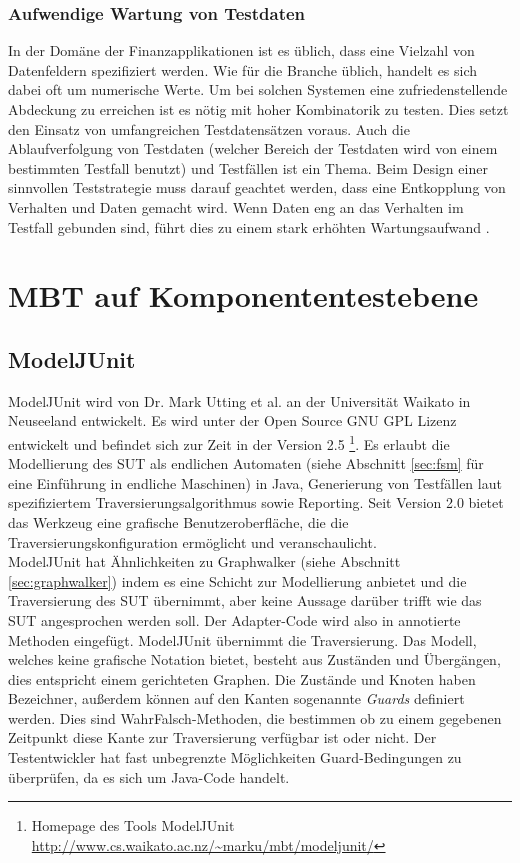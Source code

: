 \subsubsection{Aufwendige Wartung von Testdaten}
In der Domäne der Finanzapplikationen ist es üblich, dass eine Vielzahl von Datenfeldern spezifiziert werden. Wie für die Branche üblich, handelt es sich dabei oft um numerische Werte. Um bei solchen Systemen eine zufriedenstellende Abdeckung zu erreichen ist es nötig mit hoher Kombinatorik zu testen. Dies setzt den Einsatz von umfangreichen Testdatensätzen voraus. Auch die Ablaufverfolgung von Testdaten (welcher Bereich der Testdaten wird von einem bestimmten Testfall benutzt) und Testfällen ist ein Thema. Beim Design einer sinnvollen Teststrategie muss darauf geachtet werden, dass eine Entkopplung von Verhalten und Daten gemacht wird. Wenn Daten eng an das Verhalten im Testfall gebunden sind, führt dies zu einem stark erhöhten Wartungsaufwand \cite{baker_model-driven_2005}. 

\section{MBT auf Komponententestebene}
\label{sec:mbt_unit}

\subsection{ModelJUnit}
\label{sec:modeljunit}
ModelJUnit wird von Dr. Mark Utting et al. an der Universität Waikato in Neuseeland entwickelt. Es wird unter der Open Source GNU GPL Lizenz entwickelt und befindet sich zur Zeit in der Version 2.5 \footnote{Homepage des Tools ModelJUnit \url{http://www.cs.waikato.ac.nz/~marku/mbt/modeljunit/}}. Es erlaubt die Modellierung des \Gls{SUT} als endlichen Automaten (siehe Abschnitt \ref{sec:fsm} für eine Einführung in endliche Maschinen) in Java, Generierung von Testfällen laut spezifiziertem Traversierungsalgorithmus sowie Reporting. Seit Version 2.0 bietet das Werkzeug eine grafische Benutzeroberfläche, die die Traversierungskonfiguration ermöglicht und veranschaulicht.\\
ModelJUnit hat Ähnlichkeiten zu Graphwalker (siehe Abschnitt \ref{sec:graphwalker}) indem es eine Schicht zur Modellierung anbietet und die Traversierung des \gls{SUT} übernimmt, aber keine Aussage darüber trifft wie das \gls{SUT} angesprochen werden soll. Der Adapter-Code wird also in annotierte Methoden eingefügt. ModelJUnit übernimmt die Traversierung. Das Modell, welches keine grafische Notation bietet, besteht aus Zuständen und Übergängen, dies entspricht einem gerichteten Graphen. Die Zustände und Knoten haben Bezeichner, außerdem können auf den Kanten sogenannte \textit{Guards} definiert werden. Dies sind WahrFalsch-Methoden, die bestimmen ob zu einem gegebenen Zeitpunkt diese Kante zur Traversierung verfügbar ist oder nicht. Der Testentwickler hat fast unbegrenzte Möglichkeiten Guard-Bedingungen zu überprüfen, da es sich um Java-Code handelt.

